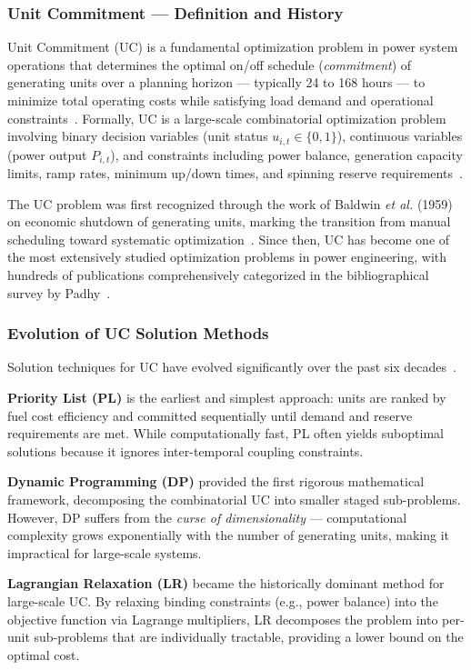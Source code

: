 \documentclass[journal]{IEEEtran}
\begin{document}
\subsubsection{Unit Commitment --- Definition and History}

Unit Commitment (UC) is a fundamental optimization problem in power
system operations that determines the optimal on/off schedule
(\textit{commitment}) of generating units over a planning horizon
--- typically 24 to 168 hours --- to minimize total operating costs
while satisfying load demand and operational
constraints~\cite{Padhy2004}. Formally, UC is a large-scale
combinatorial optimization problem involving binary decision variables
(unit status $u_{i,t} \in \{0,1\}$), continuous variables (power
output $P_{i,t}$), and constraints including power balance, generation
capacity limits, ramp rates, minimum up/down times, and spinning
reserve requirements~\cite{Conejo2010}.

The UC problem was first recognized through the work of
Baldwin \textit{et al.} (1959) on economic shutdown of generating
units, marking the transition from manual scheduling toward
systematic optimization~\cite{Padhy2004}. Since then, UC has become
one of the most extensively studied optimization problems in power
engineering, with hundreds of publications comprehensively
categorized in the bibliographical survey by Padhy~\cite{Padhy2004}.

\subsubsection{Evolution of UC Solution Methods}

Solution techniques for UC have evolved significantly over the
past six decades~\cite{Padhy2004}.

\textbf{Priority List (PL)} is the earliest and simplest approach:
units are ranked by fuel cost efficiency and committed sequentially
until demand and reserve requirements are met. While computationally
fast, PL often yields suboptimal solutions because it ignores
inter-temporal coupling constraints.

\textbf{Dynamic Programming (DP)} provided the first rigorous
mathematical framework, decomposing the combinatorial UC into
smaller staged sub-problems. However, DP suffers from the
\textit{curse of dimensionality} --- computational complexity
grows exponentially with the number of generating units, making
it impractical for large-scale systems.

\textbf{Lagrangian Relaxation (LR)} became the historically
dominant method for large-scale UC. By relaxing binding constraints
(e.g., power balance) into the objective function via Lagrange
multipliers, LR decomposes the problem into per-unit sub-problems
that are individually tractable, providing a lower bound on the
optimal cost.
\end{document}
